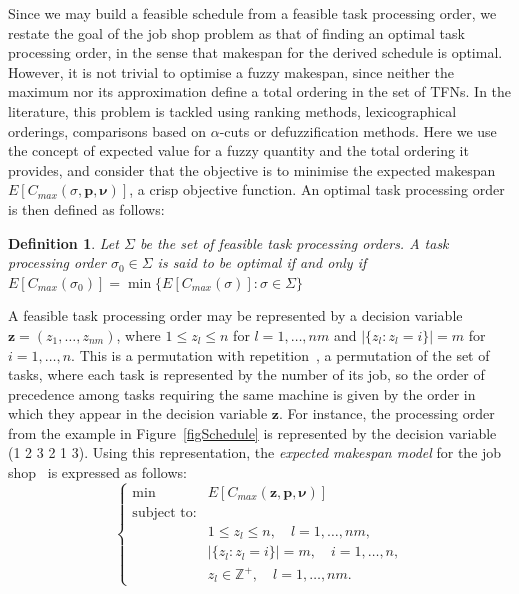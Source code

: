 \documentclass[letterpaper]{article}
\newtheorem{definition}{Definition}
\begin{document}
Since we may build a feasible schedule from a feasible task processing order, we restate the goal of the job shop problem as that of finding an optimal task processing order, in the sense that makespan for the derived schedule is optimal. However, it is not trivial to optimise a fuzzy makespan, since neither the maximum nor its approximation define a total ordering in the set of TFNs. In the literature, this problem is tackled using ranking methods, lexicographical orderings, comparisons based on $\alpha$-cuts or defuzzification methods. Here we use the concept of expected value for a fuzzy quantity and the total ordering it provides, and consider that the objective is to minimise the expected makespan $E[C_{max}(\sigma, \boldsymbol{p}, \boldsymbol{\nu})]$, a crisp objective function. An optimal task processing order is then defined as follows:
\begin{definition}
Let $\Sigma$ be the set of feasible task processing orders. A task processing order $\sigma_0 \in \Sigma$ is said to be \emph{optimal} if and only if $E[C_{max}(\sigma_0)] = \min{ \{E[C_{max}(\sigma)]: \sigma \in \Sigma \}}$
\end{definition}

A feasible task processing order may be represented by a decision variable $\boldsymbol{z}=(z_1,\dots,z_{nm})$, where $1 \leq z_l \leq n$ for $l=1,\dots,nm$ and $|\{z_l: z_l=i\}|=m$ for $i=1,\dots,n$. This is a permutation with repetition~\cite{Bierwirth1995}, a permutation of the set of tasks, where each task is represented by the number of its job, so the order of precedence among tasks requiring the same machine is given by the order in which they appear in the decision variable $\boldsymbol{z}$. For instance, the processing order from the example in Figure~\ref{figSchedule} is represented by the decision variable (1 2 3 2 1 3). Using this representation, the \emph{expected makespan model} for the job shop~\cite{GonzalezRodriguez2007b} is expressed as follows:
\begin{equation}\label{eqExpMakespanModel}
\begin{cases}
\min & E[C_{max}(\boldsymbol{z}, \boldsymbol{p},\boldsymbol{\nu})]\\
\text{subject to:} & \\
    & 1 \leq z_l \leq n, \quad l=1,\dots,nm,\\
    & |\{z_l: z_l=i\}|=m, \quad i=1,\dots,n,\\
    & z_l \in \mathbb{Z}^+, \quad l=1,\dots,nm.
\end{cases}
\end{equation}
\end{document}
